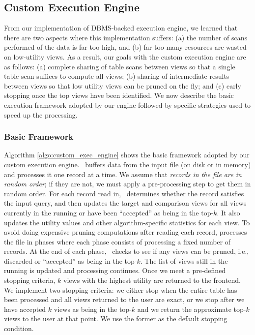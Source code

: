 

\subsection{Custom Execution Engine}
\label{sec:in_memory_execution_engine}

From our implementation of DBMS-backed execution engine, 
we learned that there are two aspects where
this implementation suffers:
(a) the number of scans performed of the data is far too high, and
(b) far too many resources are wasted on low-utility views.
As a result, our goals with the custom execution engine are as follows:
(a) complete sharing of table scans between views so that a single table scan
suffices to compute all views; 
(b) sharing of intermediate results between views so that low utility views can
be pruned on the fly; and 
(c) early stopping once the top views have been identified. 
We now describe the
basic execution framework adopted by our engine followed by specific strategies
used to speed up the processing.

\subsubsection{Basic Framework}
\label{subsec:basic_framework}
Algorithm \ref{algo:custom_exec_engine} shows the basic framework adopted by our
custom execution engine.
\VizRecDB\ buffers data from the input file (on disk or in memory) and processes it
one record at a time.
We assume that {\it records in the file are in random order}; if they are not,
we must apply a pre-processing step to get them in random order.
For each record read in, \VizRecDB\ determines whether the record satisfies the
input query, and then updates the target and comparison views for all views
currently in the running or have been ``accepted'' as being in the top-$k$.
It also updates the utility values and other algorithm-specific statistics for
each view.
To avoid doing expensive pruning computations after reading each record,
\VizRecDB processes the file in phases where each phase consists of processing a
fixed number of records.
At the end of each phase, \VizRecDB\ checks to see if any views can be pruned,
i.e., discarded or ``accepted'' as being in the top-$k$.
The list of views still in the running is updated and processing continues.
Once we meet a pre-defined stopping criteria, $k$ views with the
highest utility are returned to the frontend.
We implement two stopping criteria: we either stop when the entire table has
been processed and all views returned to the user are exact, or we stop after we
have accepted $k$ views as being in the top-$k$ and we return the approximate
top-$k$ views to the user at that point.
We use the former as the default stopping condition.

